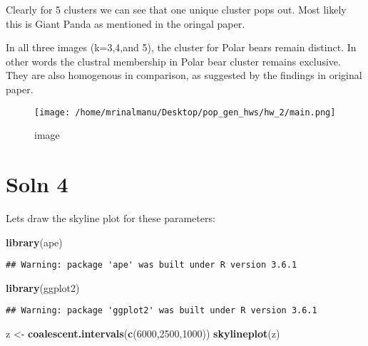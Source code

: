\documentclass[]{article}
\newenvironment{Shaded}{\begin{snugshade}}{\end{snugshade}}
\newcommand{\DecValTok}[1]{\textcolor[rgb]{0.00,0.00,0.81}{#1}}
\newcommand{\KeywordTok}[1]{\textcolor[rgb]{0.13,0.29,0.53}{\textbf{#1}}}
\newcommand{\NormalTok}[1]{#1}
\newcommand{\StringTok}[1]{\textcolor[rgb]{0.31,0.60,0.02}{#1}}
\begin{document}
Clearly for 5 clusters we can see that one unique cluster pops out. Most
likely this is Giant Panda as mentioned in the oringal paper.

In all three images (k=3,4,and 5), the cluster for Polar bears remain
distinct. In other words the clustral membership in Polar bear cluster
remains exclusive. They are also homogenous in comparison, as suggested
by the findings in original paper.

\begin{figure}
\centering
\texttt{[image: /home/mrinalmanu/Desktop/pop\_gen\_hws/hw\_2/main.png]}
\caption{image}
\end{figure}

\hypertarget{soln-4}{%
\section{Soln 4}\label{soln-4}}

Lets draw the skyline plot for these parameters:

\begin{Shaded}
\begin{Highlighting}[]
\KeywordTok{library}\NormalTok{(ape)}
\end{Highlighting}
\end{Shaded}

\begin{verbatim}
## Warning: package 'ape' was built under R version 3.6.1
\end{verbatim}

\begin{Shaded}
\begin{Highlighting}[]
\KeywordTok{library}\NormalTok{(ggplot2)}
\end{Highlighting}
\end{Shaded}

\begin{verbatim}
## Warning: package 'ggplot2' was built under R version 3.6.1
\end{verbatim}

\begin{Shaded}
\begin{Highlighting}[]
\NormalTok{z <-}\StringTok{ }\KeywordTok{coalescent.intervals}\NormalTok{(}\KeywordTok{c}\NormalTok{(}\DecValTok{6000}\NormalTok{,}\DecValTok{2500}\NormalTok{,}\DecValTok{1000}\NormalTok{))}
\KeywordTok{skylineplot}\NormalTok{(z)}
\end{Highlighting}
\end{Shaded}
\end{document}
